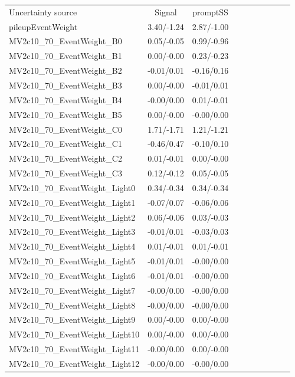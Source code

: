 \begin{table}[h]
\scriptsize
\begin{center}
\begin{tabular}{l|ccccccccc}
\hline
\hline
Uncertainty source &Signal &promptSS \\
pileupEventWeight &3.40/-1.24 &2.87/-1.00 \\
MV2c10\_70\_EventWeight\_B0 &0.05/-0.05 &0.99/-0.96 \\
MV2c10\_70\_EventWeight\_B1 &0.00/-0.00 &0.23/-0.23 \\
MV2c10\_70\_EventWeight\_B2 &-0.01/0.01 &-0.16/0.16 \\
MV2c10\_70\_EventWeight\_B3 &0.00/-0.00 &-0.01/0.01 \\
MV2c10\_70\_EventWeight\_B4 &-0.00/0.00 &0.01/-0.01 \\
MV2c10\_70\_EventWeight\_B5 &0.00/-0.00 &-0.00/0.00 \\
MV2c10\_70\_EventWeight\_C0 &1.71/-1.71 &1.21/-1.21 \\
MV2c10\_70\_EventWeight\_C1 &-0.46/0.47 &-0.10/0.10 \\
MV2c10\_70\_EventWeight\_C2 &0.01/-0.01 &0.00/-0.00 \\
MV2c10\_70\_EventWeight\_C3 &0.12/-0.12 &0.05/-0.05 \\
MV2c10\_70\_EventWeight\_Light0 &0.34/-0.34 &0.34/-0.34 \\
MV2c10\_70\_EventWeight\_Light1 &-0.07/0.07 &-0.06/0.06 \\
MV2c10\_70\_EventWeight\_Light2 &0.06/-0.06 &0.03/-0.03 \\
MV2c10\_70\_EventWeight\_Light3 &-0.01/0.01 &-0.03/0.03 \\
MV2c10\_70\_EventWeight\_Light4 &0.01/-0.01 &0.01/-0.01 \\
MV2c10\_70\_EventWeight\_Light5 &-0.01/0.01 &-0.00/0.00 \\
MV2c10\_70\_EventWeight\_Light6 &-0.01/0.01 &-0.00/0.00 \\
MV2c10\_70\_EventWeight\_Light7 &-0.00/0.00 &-0.00/0.00 \\
MV2c10\_70\_EventWeight\_Light8 &-0.00/0.00 &-0.00/0.00 \\
MV2c10\_70\_EventWeight\_Light9 &0.00/-0.00 &0.00/-0.00 \\
MV2c10\_70\_EventWeight\_Light10 &0.00/-0.00 &0.00/-0.00 \\
MV2c10\_70\_EventWeight\_Light11 &-0.00/0.00 &0.00/-0.00 \\
MV2c10\_70\_EventWeight\_Light12 &-0.00/0.00 &-0.00/0.00 \\

\end{tabular}
\end{center}
\end{table}
